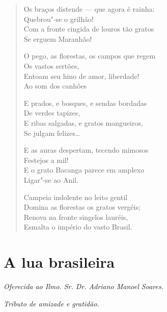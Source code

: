\begin{verse}
Os braços distende --- que agora é rainha:\\
Quebrou"-se o grilhão!\\
Com a fronte cingida de louros tão gratos\\
Se erguem Maranhão!

O pego, as florestas, os campos que regem\\
Os vastos sertões,\\
Entoam seu hino de amor, liberdade!\\
Ao som dos canhões

E prados, e bosques, e sendas bordadas\\
De verdes tapizes,\\
E ribas salgadas, e gratos mangueiros,\\
Se julgam felizes\ldots{}

E as auras despertam, tecendo mimosos\\
Festejos a mil!\\
E o grato Bacanga parece em amplexo\\
Ligar"-se ao Anil.

Campeia indolente no leito gentil\\
Domina as florestas os gratos vergéis;\\
Renova na fronte singelos lauréis,\\
Esmalta o império do vasto Brasil.
\end{verse}

\chapter{A lua brasileira}

\hfill{}\emph{Oferecida ao Ilmo. Sr. Dr. Adriano Manoel Soares.}

\hfill{}\emph{Tributo de amizade e gratidão.}

